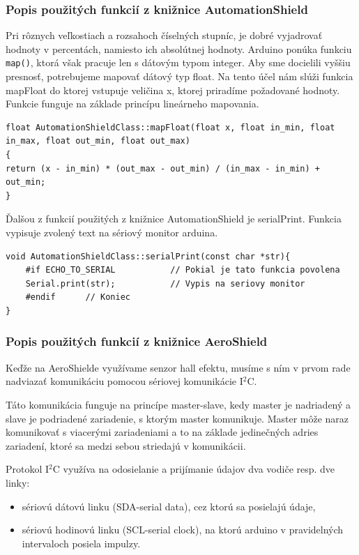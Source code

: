\subsubsection{Popis použitých funkcií z knižnice AutomationShield}

Pri rôznych veľkostiach a rozsahoch číselných stupníc, je dobré vyjadrovať hodnoty v percentách, namiesto ich absolútnej hodnoty. Arduino ponúka funkciu \verb|map()|, ktorá však pracuje len s dátovým typom integer. Aby sme docielili vyššiu presnosť, potrebujeme mapovať dátový typ float. Na tento účel nám slúži funkcia mapFloat do ktorej vstupuje veličina x, ktorej priradíme požadované hodnoty. Funkcie funguje na základe princípu lineárneho mapovania\cite{linearMap}.  

\begin{lstlisting}[caption={Zdrojový kód funkcie mapFloat.},captionpos=b]
float AutomationShieldClass::mapFloat(float x, float in_min, float in_max, float out_min, float out_max) 
{
return (x - in_min) * (out_max - out_min) / (in_max - in_min) + out_min; 
}
\end{lstlisting}

Ďalšou z funkcií použitých z knižnice AutomationShield je serialPrint. Funkcia vypisuje zvolený text na sériový monitor arduina. 

\begin{lstlisting}[caption={Zdrojový kód funkcie serialPrint.},captionpos=b]
 void AutomationShieldClass::serialPrint(const char *str){   
	#if ECHO_TO_SERIAL           // Pokial je tato funkcia povolena                       
	Serial.print(str);           // Vypis na seriovy monitor                       
	#endif 		// Koniec
}
\end{lstlisting}

\subsubsection{Popis použitých funkcií z knižnice AeroShield}


Keďže na AeroShielde využívame senzor hall efektu, musíme s ním v prvom rade nadviazať komunikáciu pomocou sériovej komunikácie I$^{2}$C.

Táto komunikácia funguje na princípe master-slave, kedy master je nadriadený a slave je podriadené zariadenie, s ktorým master komunikuje. Master môže naraz komunikovať s viacerými zariadeniami a to na základe jedinečných adries zariadení, ktoré sa medzi sebou striedajú v komunikácii.

 Protokol I$^{2}$C využíva na odosielanie a prijímanie údajov dva vodiče resp. dve linky: 
\begin{itemize}
\item sériovú dátovú linku (SDA-serial data), cez ktorú sa posielajú údaje, 
\item sériovú hodinovú linku (SCL-serial clock), na ktorú arduino v pravidelných intervaloch posiela impulzy. 
\end{itemize}

